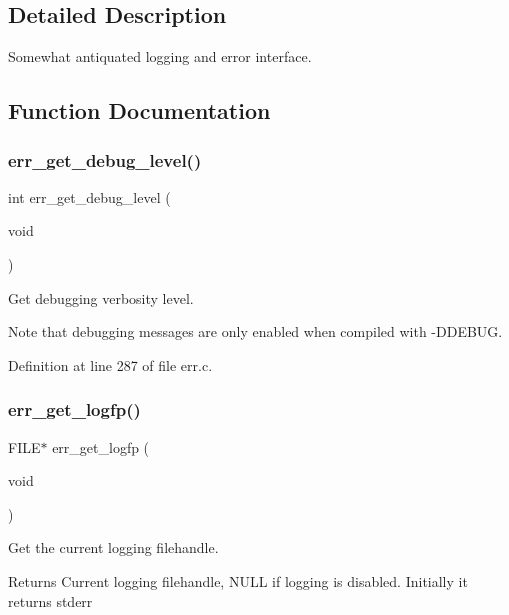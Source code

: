 \subsection{Detailed Description}
Somewhat antiquated logging and error interface. 



\subsection{Function Documentation}
\mbox{\label{err_8c_a393ad2383651d1fed0223c92208a6631}} 
\subsubsection{err\+\_\+get\+\_\+debug\+\_\+level()}
{\footnotesize\ttfamily int err\+\_\+get\+\_\+debug\+\_\+level (\begin{DoxyParamCaption}\item[{void}]{ }\end{DoxyParamCaption})}



Get debugging verbosity level. 

Note that debugging messages are only enabled when compiled with -\/\+D\+D\+E\+B\+UG. 

Definition at line 287 of file err.\+c.

\mbox{\label{err_8c_ae32e95118a1273e1e99584f2c555231a}} 
\subsubsection{err\+\_\+get\+\_\+logfp()}
{\footnotesize\ttfamily F\+I\+LE$\ast$ err\+\_\+get\+\_\+logfp (\begin{DoxyParamCaption}\item[{void}]{ }\end{DoxyParamCaption})}



Get the current logging filehandle. 

\begin{DoxyReturn}{Returns}
Current logging filehandle, N\+U\+LL if logging is disabled. Initially it returns stderr 
\end{DoxyReturn}


